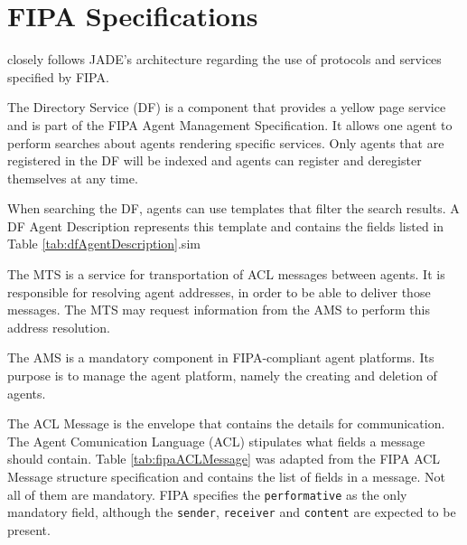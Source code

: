 \section{FIPA Specifications} %
\label{sec:fipa}

\apiname{} closely follows JADE's architecture regarding the use of protocols and services specified by FIPA. 


The Directory Service (DF) is a component that provides a yellow page service and is part of the FIPA Agent Management Specification. It allows one agent to perform searches about agents rendering specific services. Only agents that are registered in the DF will be indexed and agents can register and deregister themselves at any time.

When searching the DF, agents can use templates that filter the search results. A DF Agent Description represents this template and contains the fields listed in Table \ref{tab:dfAgentDescription}.sim


The MTS is a service for transportation of ACL messages between agents. It is responsible for resolving agent addresses, in order to be able to deliver those messages. The MTS may request information from the AMS to perform this address resolution.

The AMS is a mandatory component in FIPA-compliant agent platforms. Its purpose is to manage the agent platform, namely the creating and deletion of agents.

The ACL Message is the envelope that contains the details for communication. The Agent Comunication Language (ACL) stipulates what fields a message should contain. Table \ref{tab:fipaACLMessage} was adapted from the FIPA ACL Message structure specification and contains the list of fields in a message. Not all of them are mandatory. FIPA specifies the \texttt{performative} as the only mandatory field, although the \texttt{sender}, \texttt{receiver} and \texttt{content} are expected to be present.

